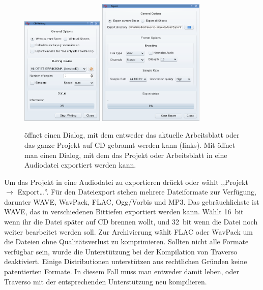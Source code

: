 \begin{figure}[t]
 \centering
 \includegraphics[width=0.35\textwidth]{../images/exportdlg}\qquad
 \includegraphics[width=0.45\textwidth]{../images/exportdlg1}
 \caption{ öffnet einen Dialog, mit dem entweder das aktuelle Arbeitsblatt oder das ganze Projekt auf CD gebrannt werden kann (links). Mit  öffnet man einen Dialog, mit dem das Projekt oder Arbeitsblatt in eine Audiodatei exportiert werden kann.}
 \label{fig_exportdlg}
\end{figure}

Um das Projekt in eine Audiodatei zu exportieren drückt  oder wählt ,,Projekt $\rightarrow$ Export\dots''. Für den Dateiexport stehen mehrere Dateiformate zur Verfügung, darunter WAVE, WavPack, FLAC, Ogg/Vorbis und MP3. Das gebräuchlichste ist WAVE, das in verschiedenen Bittiefen exportiert werden kann. Wählt 16~bit wenn ihr die Datei später auf CD brennen wollt, und 32~bit wenn die Datei noch weiter bearbeitet werden soll. Zur Archivierung wählt FLAC oder WavPack um die Dateien ohne Qualitätsverlust zu komprimieren. Sollten nicht alle Formate verfügbar sein, wurde die Unterstützung bei der Kompilation von Traverso deaktiviert. Einige Distributionen unterstützen aus rechtlichen Gründen keine patentierten Formate. In diesem Fall muss man entweder damit leben, oder Traverso mit der entsprechenden Unterstützung neu kompilieren.
